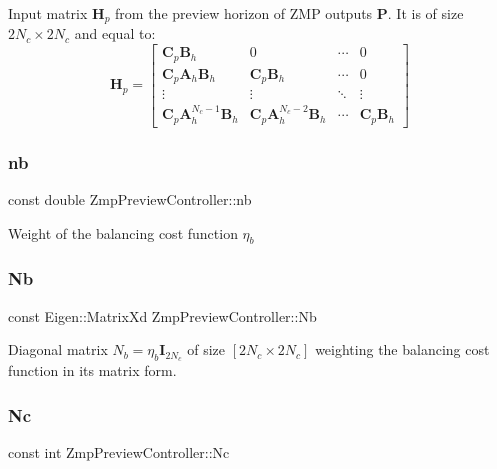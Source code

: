 Input matrix $\mathbf{H}_p$ from the preview horizon of Z\+MP outputs $\mathbf{P}$. It is of size $2N_c \times 2N_c$ and equal to\+: \[ \mathbf{H}_p = \left[\begin{array}{cccc} \mathbf{C}_p\mathbf{B}_h & 0 & \cdots & 0 \\ \mathbf{C}_p\mathbf{A}_h\mathbf{B}_h & \mathbf{C}_p\mathbf{B}_h & \cdots & 0 \\ \vdots & \vdots & \ddots & \vdots \\ \mathbf{C}_p\mathbf{A}^{N_c-1}_h\mathbf{B}_h & \mathbf{C}_p\mathbf{A}^{N_c-2}_h\mathbf{B}_h & \cdots & \mathbf{C}_p\mathbf{B}_h \end{array}\right] \] \hypertarget{classZmpPreviewController_a6716ee4c94e6f91e608ee1e29fbc7051}{}\label{classZmpPreviewController_a6716ee4c94e6f91e608ee1e29fbc7051} 
\subsubsection{\texorpdfstring{nb}{nb}}
{\footnotesize\ttfamily const double Zmp\+Preview\+Controller\+::nb\hspace{0.3cm}{\ttfamily [private]}}

Weight of the balancing cost function $ \eta_b $ \hypertarget{classZmpPreviewController_abd345d397e99ae01ad4ea80cd9894802}{}\label{classZmpPreviewController_abd345d397e99ae01ad4ea80cd9894802} 
\subsubsection{\texorpdfstring{Nb}{Nb}}
{\footnotesize\ttfamily const Eigen\+::\+Matrix\+Xd Zmp\+Preview\+Controller\+::\+Nb\hspace{0.3cm}{\ttfamily [private]}}

Diagonal matrix $N_b = \eta_b\mathbf{I}_{2N_c}$ of size $[2N_c \times 2N_c]$ weighting the balancing cost function in its matrix form. \hypertarget{classZmpPreviewController_af0c8b4aa92a6e3e95f80d81a8c91f693}{}\label{classZmpPreviewController_af0c8b4aa92a6e3e95f80d81a8c91f693} 
\subsubsection{\texorpdfstring{Nc}{Nc}}
{\footnotesize\ttfamily const int Zmp\+Preview\+Controller\+::\+Nc\hspace{0.3cm}{\ttfamily [private]}}

